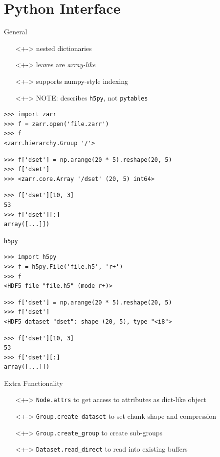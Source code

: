 \documentclass{beamer}
\begin{document}
\section{Python Interface}

\begin{frame}{General}
  \begin{itemize}
  \item[]<+-> nested dictionaries
  \item[]<+-> leaves are \textit{array-like}
  \item[]<+-> supports numpy-style indexing
  \item[]<+-> NOTE: describes \texttt{h5py}, not \texttt{pytables}
  \end{itemize}
\end{frame}

\begin{frame}[fragile]{\zarr}
  \begin{verbatim}
>>> import zarr
>>> f = zarr.open('file.zarr')
>>> f
<zarr.hierarchy.Group '/'>
  \end{verbatim}
  \pause

  \begin{verbatim}
>>> f['dset'] = np.arange(20 * 5).reshape(20, 5)
>>> f['dset']
>>> <zarr.core.Array '/dset' (20, 5) int64>
\end{verbatim}
  \pause

  \begin{verbatim}
>>> f['dset'][10, 3]
53
>>> f['dset'][:]
array([...]])
  \end{verbatim}
\end{frame}

\begin{frame}[fragile]{\texttt{h5py}}
  \begin{verbatim}
>>> import h5py
>>> f = h5py.File('file.h5', 'r+')
>>> f
<HDF5 file "file.h5" (mode r+)>
  \end{verbatim}

  \begin{verbatim}
>>> f['dset'] = np.arange(20 * 5).reshape(20, 5)
>>> f['dset']
<HDF5 dataset "dset": shape (20, 5), type "<i8">
\end{verbatim}

  \begin{verbatim}
>>> f['dset'][10, 3]
53
>>> f['dset'][:]
array([...]])
  \end{verbatim}
\end{frame}

\begin{frame}{Extra Functionality}
  \begin{itemize}
  \item[]<+-> \texttt{Node.attrs} to get access to attributes as dict-like object
  \item[]<+-> \texttt{Group.create\_dataset} to set chunk shape and compression
  \item[]<+-> \texttt{Group.create\_group} to create sub-groups
  \item[]<+-> \texttt{Dataset.read\_direct} to read into existing buffers
  \end{itemize}
\end{frame}
\end{document}
